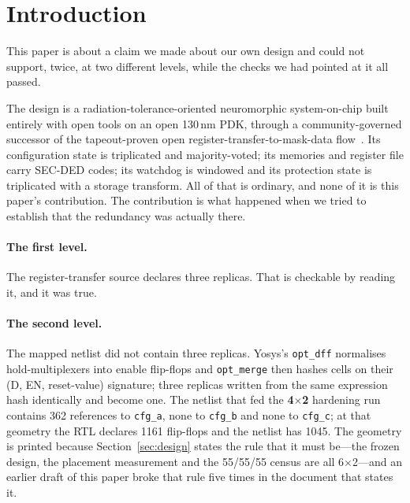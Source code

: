 \documentclass[11pt,a4paper]{article}
\begin{document}
\section{Introduction}
\label{sec:intro}

This paper is about a claim we made about our own design and could not
support, twice, at two different levels, while the checks we had pointed
at it all passed.

The design is a radiation-tolerance-oriented neuromorphic
system-on-chip built entirely with open tools on an open 130\,nm PDK,
through a community-governed successor of the tapeout-proven open
register-transfer-to-mask-data flow~\cite{openlane2020}.
Its configuration state is triplicated and majority-voted; its memories
and register file carry SEC-DED codes; its watchdog is windowed and its
protection state is triplicated with a storage transform. All of that is
ordinary, and none of it is this paper's contribution.
The contribution is what happened when we tried to establish that the
redundancy was actually there.

\paragraph{The first level.}
The register-transfer source declares three replicas. That is checkable
by reading it, and it was true.

\paragraph{The second level.}
The mapped netlist did not contain three replicas. Yosys's
\texttt{opt\_dff} normalises hold-multiplexers into enable flip-flops and
\texttt{opt\_merge} then hashes cells on their (D, EN, reset-value)
signature; three replicas written from the same expression hash
identically and become one. The netlist that fed the \textbf{4$\times$2}
hardening run contains 362 references to \texttt{cfg\_a}, none to
\texttt{cfg\_b} and none to \texttt{cfg\_c}; at that geometry the RTL
declares \num{1161} flip-flops and the netlist has \num{1045}. The
geometry is printed because Section~\ref{sec:design} states the rule
that it must be---the frozen design, the placement measurement and the
55/55/55 census are all 6$\times$2---and an earlier draft of this paper
broke that rule five times in the document that states it.
\end{document}
